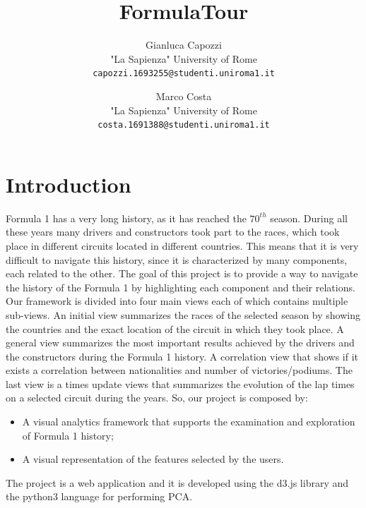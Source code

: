 \documentclass[10pt,twocolumn,letterpaper]{article}
\title{\LARGE FormulaTour}
\author{Gianluca Capozzi\\
	"La Sapienza" University of Rome\\
	{\tt\small capozzi.1693255@studenti.uniroma1.it}
	\and
	Marco Costa\\
	"La Sapienza" University of Rome\\
	{\tt\small costa.1691388@studenti.uniroma1.it}
}
\begin{document}

\begin{abstract}

\end{abstract}

\section{Introduction}
Formula 1 has a very long history, as it has reached the $70^{th}$ season. During all these years many drivers and constructors took part to the races, which took
place in different circuits located in different countries. This means that it is very difficult to navigate this history, since it is characterized by many components,
each related to the other. The goal of this project is to provide a way to navigate the history of the Formula 1 by highlighting each component and their relations.
Our framework is divided into four main views each of which contains multiple sub-views. An initial view summarizes the races of the selected season by showing
the countries and the exact location of the circuit in which they took place. A general view summarizes the most important results achieved by the drivers and the
constructors during the Formula 1 history. A correlation view that shows if it exists a correlation between nationalities and number of victories/podiums. The last
view is a times update views that summarizes the evolution of the lap times on a selected circuit during the years. So, our project is composed by:
\begin{itemize}
	\item A visual analytics framework that supports the examination and exploration of Formula 1 history;
	\item A visual representation of the features selected by the users.
\end{itemize}
The project is a web application and it is developed using the d3.js library and the python3 language for performing PCA.
\end{document}
